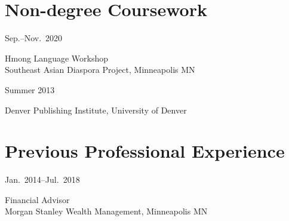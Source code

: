 \documentclass[11pt,oneside,DIV=calc,parskip=off]{scrarticle} %
\newlength{\leftcolwidth}
\newlength{\rightcolwidth}
\newlength{\spacingbefore}
\newlength{\spacingafter}
\newcommand{\mytwocol}[2]{%
	\vspace{\spacingbefore}%
	\begin{minipage}[t]{\leftcolwidth}%
		\strut#1%
	\end{minipage}%
	\begin{minipage}[t]{\rightcolwidth}%
		\strut#2%
	\end{minipage}%
	\vspace{\spacingafter}\par%
	}
\newcommand{\cvline}[2]{%
	\mytwocol{#1}{#2}%
	}
\begin{document}
\section{Non-degree Coursework}
\cvline{Sep.--Nov.\ 2020}{Hmong Language Workshop\\Southeast Asian Diaspora Project, Minneapolis MN}
\cvline{Summer 2013}{Denver Publishing Institute, University of Denver}

\section{Previous Professional Experience}
\cvline{Jan.\ 2014--Jul.\ 2018}{Financial Advisor\\Morgan Stanley Wealth Management, Minneapolis MN}

\end{document}
